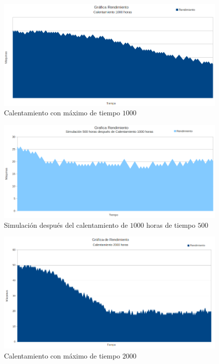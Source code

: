 \documentclass[12pt]{article}
\begin{document}
\begin{figure}
  \centering
	\includegraphics[scale=0.4]{graf1.png} 
  \caption{Calentamiento con m\'aximo de tiempo $1000$}
  \label{fig:cal1}
\end{figure}

\begin{figure}
  \centering
	\includegraphics[scale=0.4]{graf2.png} 
  \caption{Simulaci\'on despu\'es del calentamiento de $1000$ horas de tiempo $500$}
  \label{fig:descal1}
\end{figure}

\begin{figure}
  \centering
	\includegraphics[scale=0.4]{graf3.png} 
  \caption{Calentamiento con m\'aximo de tiempo $2000$}
  \label{fig:descal2}
\end{figure}
\end{document}
